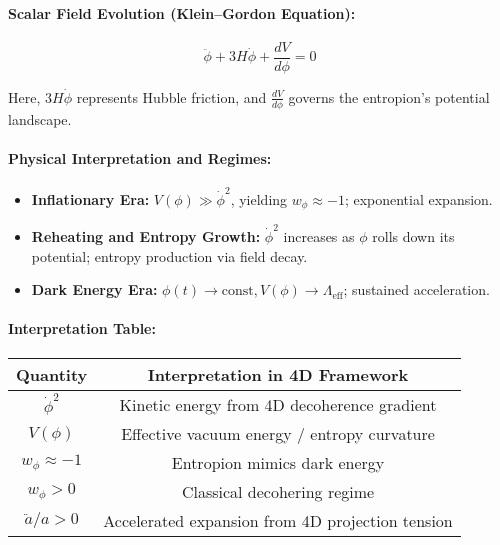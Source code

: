 \documentclass[12pt]{article}
\begin{document}
\vspace{1em}
\noindent
\paragraph{Scalar Field Evolution (Klein–Gordon Equation):}
\begin{equation}
\ddot{\phi} + 3H \dot{\phi} + \frac{dV}{d\phi} = 0
\tag{A8.3}
\label{eq:A8.3}
\end{equation}

Here, \(3H \dot{\phi}\) represents Hubble friction, and \(\frac{dV}{d\phi}\) governs the entropion's potential landscape.

\vspace{1em}
\noindent
\paragraph{Physical Interpretation and Regimes:}

\begin{itemize}
  \item \textbf{Inflationary Era:} \(V(\phi) \gg \dot{\phi}^2\), yielding \(w_\phi \approx -1\); exponential expansion.
  \item \textbf{Reheating and Entropy Growth:} \(\dot{\phi}^2\) increases as \(\phi\) rolls down its potential; entropy production via field decay.
  \item \textbf{Dark Energy Era:} \(\phi(t) \to \text{const}, V(\phi) \to \Lambda_{\text{eff}}\); sustained acceleration.
\end{itemize}

\vspace{1em}
\noindent
\paragraph{Interpretation Table:}

\begin{center}
\begin{tabular}{|c|c|}
\hline
\textbf{Quantity} & \textbf{Interpretation in 4D Framework} \\
\hline
\(\dot{\phi}^2\) & Kinetic energy from 4D decoherence gradient \\
\(V(\phi)\) & Effective vacuum energy / entropy curvature \\
\(w_\phi \approx -1\) & Entropion mimics dark energy \\
\(w_\phi > 0\) & Classical decohering regime \\
\(\ddot{a}/a > 0\) & Accelerated expansion from 4D projection tension \\
\hline
\end{tabular}
\end{center}
\end{document}
